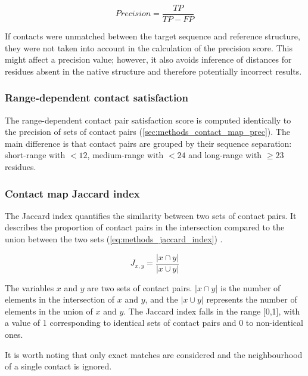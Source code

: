 \begin{equation} 
    Precision=\frac{TP}{TP-FP}
    \label{eq:methods_contact_precision}
\end{equation}

If contacts were unmatched between the target sequence and reference structure, they were not taken into account in the calculation of the precision score. This might affect a precision value; however, it also avoids inference of distances for residues absent in the native structure and therefore potentially incorrect results.

\subsubsection{Range-dependent contact satisfaction} \label{sec:methods_longrange_satisfaction}
The range-dependent contact pair satisfaction score is computed identically to the precision of sets of contact pairs (\cref{sec:methods_contact_map_prec}). The main difference is that contact pairs are grouped by their sequence separation: short-range with $<12$, medium-range with $<24$ and long-range with $\geq23$ residues.

\subsubsection{Contact map Jaccard index}
The Jaccard index quantifies the similarity between two sets of contact pairs. It describes the proportion of contact pairs in the intersection compared to the union between the two sets (\cref{eq:methods_jaccard_index}) \cite{Wuyun2016-hh}.

\begin{equation}
    J_{x,y}=\frac{\left |x \cap y\right |}{\left |x \cup y\right |}
    \label{eq:methods_jaccard_index}
\end{equation}

The variables $x$ and $y$ are two sets of contact pairs. $\left |x \cap y\right |$ is the number of elements in the intersection of $x$ and $y$, and the $\left |x \cup y\right |$ represents the number of elements in the union of $x$ and $y$. The Jaccard index falls in the range [0,1], with a value of 1 corresponding to identical sets of contact pairs and 0 to non-identical ones. 

It is worth noting that only exact matches are considered and the neighbourhood of a single contact is ignored.
